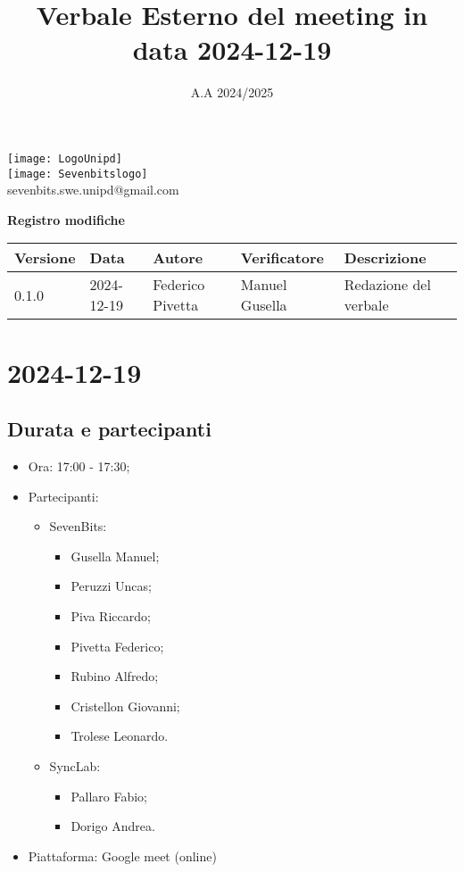 \documentclass[10pt]{article}
\title{Verbale Esterno del meeting in data 2024-12-19}
\date{A.A 2024/2025}
\begin{document}
\maketitle
\begin{center}
\texttt{[image: LogoUnipd]}\\
\texttt{[image: Sevenbitslogo]}\\
sevenbits.swe.unipd@gmail.com\\
\vspace{2mm}

\textbf{Registro modifiche}\\
\vspace{2mm}
\begin{tabularx}{\textwidth}{|l|l|l|l|X|}
\hline
\textbf{Versione} & \textbf{Data} & \textbf{Autore} & \textbf{Verificatore} & \textbf{Descrizione} \\
\hline
0.1.0 & 2024-12-19 & Federico Pivetta & Manuel Gusella & Redazione del verbale\\
\hline
\end{tabularx}
\end{center}

\newpage
\tableofcontents

\newpage
\section{2024-12-19}
\subsection{Durata e partecipanti}
\begin{itemize}
\item Ora: 17:00 - 17:30;
\item Partecipanti: 	
	\begin{itemize}
            \item SevenBits:
            \begin{itemize}
	              \item Gusella Manuel;
                    \item Peruzzi Uncas;
                    \item Piva Riccardo;
                    \item Pivetta Federico;
                    \item Rubino Alfredo;
                    \item Cristellon Giovanni;
                    \item Trolese Leonardo.
	    \end{itemize}
            \item SyncLab:
            \begin{itemize}
                \item Pallaro Fabio;
                \item Dorigo Andrea.
            \end{itemize}
        \end{itemize}
\item Piattaforma: Google meet (online)
\end{itemize}
\end{document}
